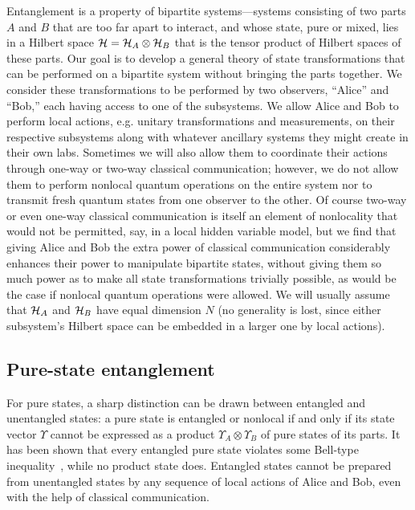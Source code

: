 Entanglement is a property of bipartite systems---systems
consisting of two parts $A$ and $B$ that are too far apart to interact,
and whose state, pure or mixed, lies in a Hilbert space ${\cal H}= {\cal
H}_A\otimes{\cal H}_B$ that is the tensor product of Hilbert spaces of
these parts.   Our goal is to develop a general theory of state
transformations that can be performed on a bipartite system without
bringing the parts together.  We consider these transformations to be
performed by two observers, ``Alice'' and ``Bob,'' each having access to
one of the subsystems.  We allow Alice and Bob to perform local actions,
e.g. unitary transformations and measurements, on their respective
subsystems along with whatever ancillary systems they might create in
their own labs.  Sometimes we will also  allow them to coordinate their
actions through one-way or two-way classical communication; however, we
do not allow them to perform nonlocal quantum operations on the entire
system nor to transmit fresh quantum states from one observer to the
other.  Of course two-way or even one-way classical communication is
itself an element of nonlocality that would not be permitted, say, in a
local hidden variable model, but we find that giving Alice and Bob the
extra power of classical communication considerably enhances their power
to manipulate bipartite states, without giving them so much power as to
make all state transformations trivially possible, as would be the case
if nonlocal quantum operations were allowed.  We will usually assume that
${\cal H}_A$ and ${\cal H}_B$ have equal dimension $N$ (no generality is
lost, since either subsystem's Hilbert space can be embedded in a larger
one by local actions).
 
\subsection{Pure-state entanglement}
\label{subsec:pse}
 
For pure states, a sharp distinction can be drawn between entangled and
unentangled states: a pure state is entangled or nonlocal if and only
if its state vector $\Upsilon$ cannot be expressed as a product
$\Upsilon_A\otimes\Upsilon_B$ of pure states of its parts. It has been shown
that every entangled pure state violates some Bell-type
inequality~\cite{Gisin}, while no product state does.  Entangled states
cannot be prepared from unentangled states by any sequence of local
actions of Alice and Bob, even with the help of classical communication.
 
